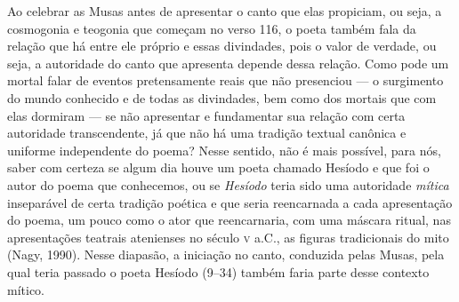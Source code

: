 Ao celebrar as Musas antes de apresentar o canto que elas propiciam, ou
seja, a cosmogonia e teogonia que começam no verso 116, o poeta também
fala da relação que há entre ele próprio e essas divindades, pois o
valor de verdade, ou seja, a autoridade do canto que apresenta depende
dessa relação. Como pode um mortal falar de eventos pretensamente reais
que não presenciou --- o surgimento do mundo conhecido e de todas as
divindades, bem como dos mortais que com elas dormiram --- se não
apresentar e fundamentar sua relação com certa autoridade transcendente,
já que não há uma tradição textual canônica e uniforme independente do
poema? Nesse sentido, não é mais possível, para nós, saber com certeza
se algum dia houve um poeta chamado Hesíodo e que foi o autor do poema
que conhecemos, ou se \textit{Hesíodo} teria sido uma autoridade
\textit{mítica} inseparável de certa tradição poética e que seria
reencarnada a cada apresentação do poema, um pouco como o ator que
reencarnaria, com uma máscara ritual, nas apresentações teatrais
atenienses no século \textsc{v} a.C., as figuras tradicionais do mito (Nagy,
1990). Nesse diapasão, a iniciação no canto, conduzida pelas Musas, pela
qual teria passado o poeta Hesíodo (9--34) também faria parte desse
contexto mítico.



